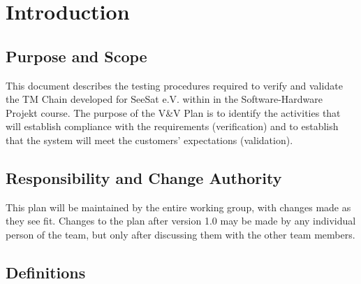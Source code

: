 \chapter{Introduction}	


\section{Purpose and Scope}

This document describes the testing procedures required to verify and validate the TM Chain developed for SeeSat e.V. within in the Software-Hardware Projekt course. The purpose of the V\&V Plan is to identify the activities that will establish compliance with the requirements (verification) and to establish that the system will meet the customers’ expectations (validation).

\section{Responsibility and Change Authority}

This plan will be maintained by the entire working group, with changes made as they see fit. Changes to the plan after version 1.0 may be made by any individual person of the team, but only after discussing them with the other team members.

\section{Definitions}





